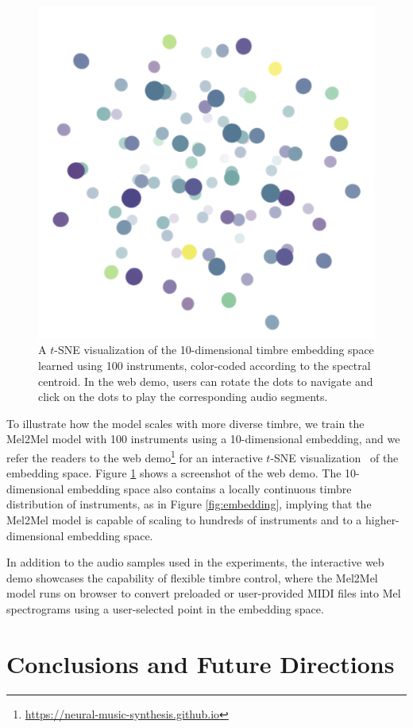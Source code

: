 \begin{figure}
	\centering
	\includegraphics[width=0.5\linewidth]{100inst.png}
	\caption{A $t$-SNE visualization of the 10-dimensional timbre embedding space learned using 100 instruments, color-coded according to the spectral centroid. In the web demo, users can rotate the dots to navigate and click on the dots to play the corresponding audio segments.}\label{fig:100inst}
\end{figure}

To illustrate how the model scales with more diverse timbre, we train the Mel2Mel model with 100 instruments using a 10-dimensional embedding, and we refer the readers to the web demo\footnote{\url{https://neural-music-synthesis.github.io}} for an interactive $t$-SNE visualization~\cite{maaten2008tsne} of the embedding space. Figure \ref{fig:100inst} shows a screenshot of the web demo.
The 10-dimensional embedding space also contains a locally continuous timbre distribution of instruments, as in Figure \ref{fig:embedding}, implying that the Mel2Mel model is capable of scaling to hundreds of instruments and to a higher-dimensional embedding space.

In addition to the audio samples used in the experiments, the interactive web demo showcases the capability of flexible timbre control, where the Mel2Mel model runs on browser to convert preloaded or user-provided MIDI files into Mel spectrograms using a user-selected point in the embedding space.

\section{Conclusions and Future Directions}\label{sec:conclusions}

